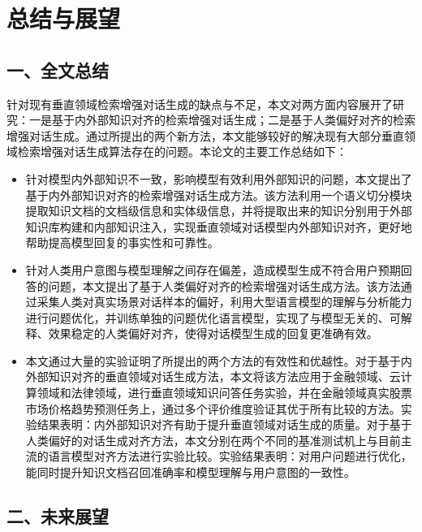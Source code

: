 \chapter{总结与展望}

\section*{一、全文总结}

针对现有垂直领域检索增强对话生成的缺点与不足，本文对两方面内容展开了研究：一是基于内外部知识对齐的检索增强对话生成；二是基于人类偏好对齐的检索增强对话生成。通过所提出的两个新方法，本文能够较好的解决现有大部分垂直领域检索增强对话生成算法存在的问题。本论文的主要工作总结如下：

\begin{itemize}[topsep = 0 pt, itemsep= 0 pt, parsep=0pt, partopsep=0pt, leftmargin=20pt, itemindent=0pt, labelsep=6pt, listparindent=24pt]
	\item 针对模型内外部知识不一致，影响模型有效利用外部知识的问题，本文提出了基于内外部知识对齐的检索增强对话生成方法。该方法利用一个语义切分模块提取知识文档的文档级信息和实体级信息，并将提取出来的知识分别用于外部知识库构建和内部知识注入，实现垂直领域对话模型内外部知识对齐，更好地帮助提高模型回复的事实性和可靠性。

	\item 针对人类用户意图与模型理解之间存在偏差，造成模型生成不符合用户预期回答的问题，本文提出了基于人类偏好对齐的检索增强对话生成方法。该方法通过采集人类对真实场景对话样本的偏好，利用大型语言模型的理解与分析能力进行问题优化，并训练单独的问题优化语言模型，实现了与模型无关的、可解释、效果稳定的人类偏好对齐，使得对话模型生成的回复更准确有效。
	
    \item 本文通过大量的实验证明了所提出的两个方法的有效性和优越性。对于基于内外部知识对齐的垂直领域对话生成方法，本文将该方法应用于金融领域、云计算领域和法律领域，进行垂直领域知识问答任务实验，并在金融领域真实股票市场价格趋势预测任务上，通过多个评价维度验证其优于所有比较的方法。实验结果表明：内外部知识对齐有助于提升垂直领域对话生成的质量。对于基于人类偏好的对话生成对齐方法，本文分别在两个不同的基准测试机上与目前主流的语言模型对齐方法进行实验比较。实验结果表明：对用户问题进行优化，能同时提升知识文档召回准确率和模型理解与用户意图的一致性。
\end{itemize}

\section*{二、未来展望}

